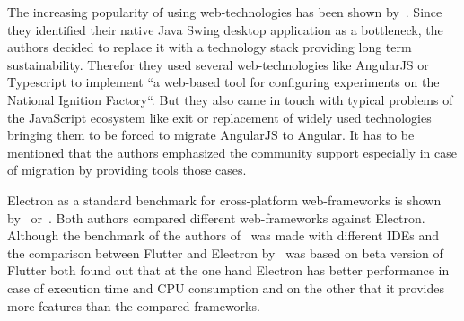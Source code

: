 The increasing popularity of using web-technologies has been shown by~\cite{pernice:icalepcs2019-wempr006}.
Since they identified their native Java Swing desktop application as a bottleneck, the authors decided to replace it with a technology stack providing long term sustainability.
Therefor they used several web-technologies like AngularJS or Typescript to implement ``a web-based tool for configuring experiments on the National Ignition Factory``.
But they also came in touch with typical problems of the JavaScript ecosystem like exit or replacement of widely used technologies bringing them to be forced to migrate
AngularJS to Angular.
It has to be mentioned that the authors emphasized the community support especially in case of migration by providing tools those cases.


Electron as a standard benchmark for cross-platform web-frameworks is shown by~\cite{electron-javafx} or~\cite{flutter}.
Both authors compared different web-frameworks against Electron.
Although the benchmark of the authors of~\cite{electron-javafx} was made with different \ac{IDE}s and the comparison between Flutter and Electron by~\cite{flutter} was based on beta version of Flutter
both found out that at the one hand Electron has better performance in case of execution time and CPU consumption and on the other that it provides more features than the compared frameworks.

